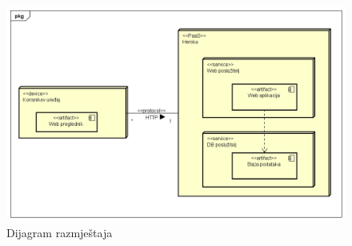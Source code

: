 {			\begin{figure}[!h]
				\centering
				\includegraphics[width=1\linewidth]{slike/Dijagram_razmjestaja}
				\caption{Dijagram razmještaja}
				\label{fig:dijagramrazmjestaja}
			\end{figure}
			\eject
			
			\eject 
		
}

